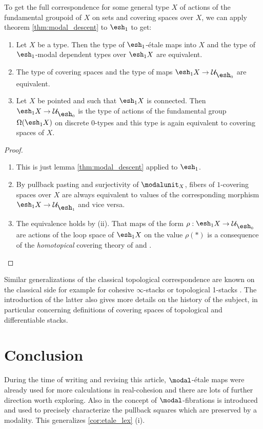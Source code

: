 \documentclass{msc}
\newcommand{\shape}{\ensuremath{\mathord{\raisebox{0.5pt}{\text{\rm\esh}}}}}
\begin{document}
To get the full correspondence for some general type $X$ of actions of the fundamental groupoid of $X$ on sets and covering spaces over $X$,
we can apply theorem \ref{thm:modal_descent} to $\shape_1$ to get:

\begin{thm}
  \begin{enumerate}
  \item Let $X$ be a type. Then the type of $\shape_1$-étale maps into $X$ and the type of $\shape_1$-modal dependent types over $\shape_1 X$ are equivalent.
  \item The type of covering spaces and the type of maps $\shape_1X\to \mathcal U_{\shape_0}$ are equivalent.
  \item Let $X$ be pointed and such that $\shape_1 X$ is connected. Then $\shape_1X\to \mathcal U_{\shape_0}$ is the type of actions of the fundamental group $\Omega(\shape_1 X)$ on discrete $0$-types and this type is again equivalent to covering spaces of $X$.
  \end{enumerate}
\end{thm}
\begin{proof}
  \begin{enumerate}
  \item This is just lemma \ref{thm:modal_descent} applied to $\shape_1$.
  \item By pullback pasting and surjectivity of $\modalunit_X$, fibers of $1$-covering spaces over $X$ are always equivalent to values of the corresponding morphism $\shape_1 X\to \mathcal U_{\shape_1}$ and vice versa.
  \item The equivalence holds by (ii).
    That maps of the form $\rho:\shape_1 X\to \mathcal U_{\shape_0}$ are actions of the loop space of $\shape_1 X$ on the value $\rho(\ast)$ is a consequence of the \emph{homotopical} covering theory of \cite[Section 3.1]{favonia-thesis} and \cite[Section 7.1]{ulrik-egbert-floris-groups-published}. \qedhere
  \end{enumerate}
\end{proof}

Similar generalizations of the classical topological correspondence are known on the classical side
for example for cohesive $\infty$-stacks \cite[Section 5.2.7]{SchreiberDcct} or topological 1-stacks \cite{dmr-2covers}.
The introduction of the latter also gives more details on the history of the subject,
in particular concerning definitions of covering spaces of topological and differentiable stacks.


\section*{Conclusion}
During the time of writing and revising this article,
$\modal$-étale maps were already used for more calculations in real-cohesion \cite{myers2019}
and there are lots of further direction worth exploring.
Also in \cite{myers2019} the concept of $\modal$-fibrations is introduced
and used to precisely characterize the pullback squares which are preserved by a modality.
This generalizes \cref{cor:etale_lex} (i). 
\end{document}
